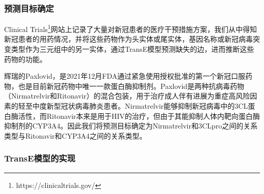 \documentclass[twocolumn]{article}
\begin{document}
\subsubsection{预测目标确定\label{chap:prediction_target}}
Clinical Trials\footnote{https://clinicaltrials.gov/}网站上记录了大量对新冠患者的医疗干预措施方案，我们从中得知新冠患者的用药情况，并将这些药物作为头实体或尾实体，基因名称或新冠病毒突变类型作为三元组中的另一实体，通过TransE模型预测缺失的边，进而推断这些药物的功能。\par
辉瑞的Paxlovid，是2021年12月FDA通过紧急使用授权批准的第一个新冠口服药物，也是目前新冠药物中唯一一款蛋白酶抑制剂。Paxlovid是两种抗病毒药物（Nirmatrelvir和Ritonavir）的混合包装，用于治疗成人伴有进展为重症高风险因素的轻至中度新型冠状病毒肺炎患者。Nirmatrelvir能够抑制新冠病毒中的3CL蛋白酶活性，而Ritonavir本来是用于HIV的治疗，但由于其能抑制人体内靶向蛋白酶抑制剂的CYP3A4。因此我们将预测目标确定为Nirmatrelvir和3CLpro之间的关系类型与Ritonavir和CYP3A4之间的关系类型。\par

\subsubsection{TransE模型的实现\label{chap:transe}}
\end{document}
